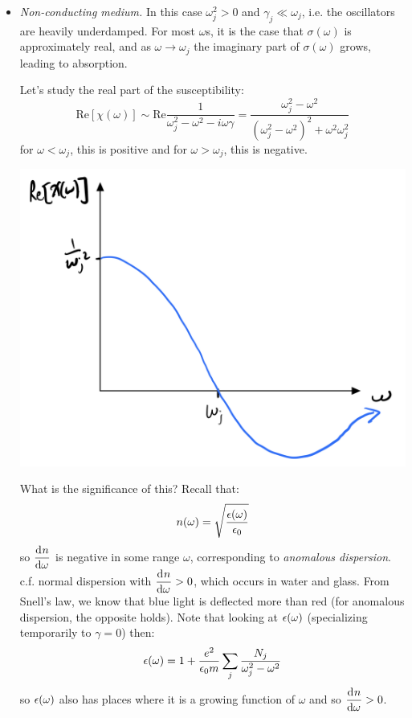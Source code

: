 \begin{itemize}
    \item \emph{Non-conducting medium.} In this case $\omega_j^2 > 0$ and $\gamma_j \ll \omega_j$, i.e. the oscillators are heavily underdamped. For most $\omega$s, it is the case that $\sigma(\omega)$ is approximately real, and as $\omega \to \omega_j$ the imaginary part of $\sigma(\omega)$ grows, leading to absorption.

    Let's study the real part of the susceptibility:
    \begin{equation}
        \text{Re}[\chi(\omega)] \sim \text{Re}\frac{1}{\omega_j^2 - \omega^2 - i\omega\gamma} = \frac{\omega_j^2 - \omega^2}{(\omega_j^2 - \omega^2)^2 + \omega^2\omega_j^2}
    \end{equation}
    for $\omega < \omega_j$, this is positive and for $\omega > \omega_j$, this is negative.

    \begin{center}
        \includegraphics[scale=0.35]{Lectures/Images/lec14-rechi.png}
    \end{center}

    What is the significance of this? Recall that:
    \begin{equation}
        n(\omega) = \sqrt{\frac{\epsilon(\omega)}{\epsilon_0}}
    \end{equation}
    so $\dod{n}{\omega}$ is negative in some range $\omega$, corresponding to \emph{anomalous dispersion}. c.f. normal dispersion with $\dod{n}{\omega} > 0$, which occurs in water and glass. From Snell's law, we know that blue light is deflected more than red (for anomalous dispersion, the opposite holds). Note that looking at $\epsilon(\omega)$ (specializing temporarily to $\gamma = 0$) then:
    \begin{equation}
        \epsilon(\omega) = 1 + \frac{e^2}{\epsilon_0m}\sum_j \frac{N_j}{\omega_j^2 - \omega^2}
    \end{equation}
    so $\epsilon(\omega)$ also has places where it is a growing function of $\omega$ and so $\dod{n}{\omega} > 0$.
    

\end{itemize}
